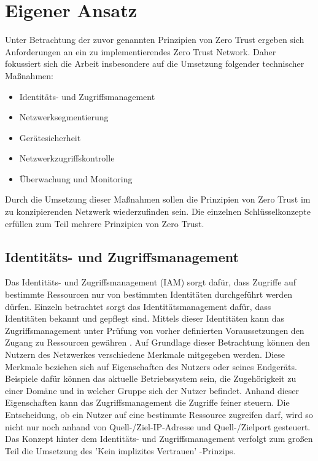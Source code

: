 \documentclass[lettersize,journal]{IEEEtran}
\begin{document}
\section{Eigener Ansatz}
Unter Betrachtung der zuvor genannten Prinzipien von Zero Trust ergeben sich Anforderungen an ein zu implementierendes Zero Trust Network. Daher fokussiert sich die Arbeit insbesondere auf die Umsetzung folgender technischer Maßnahmen:

\begin{itemize}
	\item Identitäts- und Zugriffsmanagement
	\item Netzwerksegmentierung
	\item Gerätesicherheit
	\item Netzwerkzugriffskontrolle
	\item Überwachung und Monitoring
\end{itemize}
Durch die Umsetzung dieser Maßnahmen sollen die Prinzipien von Zero Trust im zu konzipierenden Netzwerk wiederzufinden sein. Die einzelnen Schlüsselkonzepte erfüllen zum Teil mehrere Prinzipien von Zero Trust.

\subsection{Identitäts- und Zugriffsmanagement}
Das Identitäts- und Zugriffsmanagement (IAM) sorgt dafür, dass Zugriffe auf bestimmte Ressourcen nur von bestimmten Identitäten durchgeführt werden dürfen. Einzeln betrachtet sorgt das Identitätsmanagement dafür, dass Identitäten bekannt und gepflegt sind. Mittels dieser Identitäten kann das Zugriffsmanagement unter Prüfung von vorher definierten Voraussetzungen den Zugang zu Ressourcen gewähren \cite{von1sicherheit}. Auf Grundlage dieser Betrachtung können den Nutzern des Netzwerkes verschiedene Merkmale mitgegeben werden. Diese Merkmale beziehen sich auf Eigenschaften des Nutzers oder seines Endgeräts. Beispiele dafür können das aktuelle Betriebssystem sein, die Zugehörigkeit zu einer Domäne und in welcher Gruppe sich der Nutzer befindet. Anhand dieser Eigenschaften kann das Zugriffsmanagement die Zugriffe feiner steuern. Die Entscheidung, ob ein Nutzer auf eine bestimmte Ressource zugreifen darf, wird so nicht nur noch anhand von Quell-/Ziel-IP-Adresse und Quell-/Zielport gesteuert. Das Konzept hinter dem Identitäts- und Zugriffsmanagement verfolgt zum großen Teil die Umsetzung des 'Kein implizites Vertrauen' -Prinzips.
\end{document}

